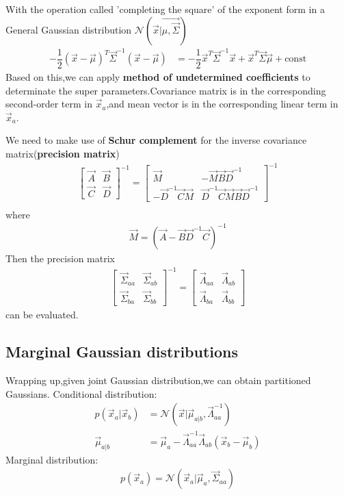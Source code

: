 With the operation called 'completing the square' of the exponent form in a General Gaussian distribution $\mathcal{N}(\vec{x}|\vec{\mu,\vec{\Sigma}})$
\begin{align}
-\dfrac{1}{2}(\vec{x}-\vec{\mu})^T\vec{\Sigma}^{-1}(\vec{x}-\vec{\mu}) &= 
-\dfrac{1}{2}\vec{x}^T\vec{\Sigma}^{-1}\vec{x}+\vec{x}^T\vec{\Sigma}\vec{\mu} + \text{const}
\end{align}
Based on this,we can apply \textbf{method of undetermined coefficients} to determinate the super parameters.Covariance matrix is in the corresponding second-order term in $\vec{x}_a$,and mean vector is in the corresponding linear term in $\vec{x}_a$. 

We need to make use of \textbf{Schur complement} for the inverse covariance matrix(\textbf{precision matrix})
\begin{align}
\left[ \begin{array}{cc} 
\vec{A} & \vec{B} \\
\vec{C} & \vec{D}  
\end{array}\right]^{-1}
= \left[ \begin{array}{cc} 
\vec{M} & -\vec{M}\vec{B}\vec{D}^{-1} \\
-\vec{D}^{-1}\vec{C}\vec{M} & \vec{D}^{-1}\vec{C}\vec{M}\vec{B}\vec{D}^{-1}
\end{array}\right]^{-1} \\
\end{align}
where
\begin{align}
\vec{M} = (\vec{A}-\vec{B}\vec{D}^{-1}\vec{C})^{-1}
\end{align}
Then the precision matrix
\begin{align}
\left[ \begin{array}{cc}
 \vec{\Sigma}_{aa} & \vec{\Sigma}_{ab} \\
 \vec{\Sigma}_{ba} & \vec{\Sigma}_{bb} 
 \end{array}\right]^{-1} =
 \left[ \begin{array}{cc} \vec{\varLambda}_{aa} & \vec{\varLambda}_{ab} \\
  \vec{\varLambda}_{ba} & \vec{\varLambda}_{bb} \end{array}\right]
\end{align}
can be evaluated.

\subsection{Marginal Gaussian distributions}
Wrapping up,given joint Gaussian distribution,we can obtain partitioned Gaussians.
Conditional distribution:
\begin{align}
p(\vec{x}_a|\vec{x}_b) &= \mathcal{N}(\vec{x}|\vec{\mu}_{a|b},\vec{\varLambda}_{aa}^{-1}) \\
\vec{\mu}_{a|b} &= \vec{\mu}_a-\vec{\varLambda}_{aa}^{-1}\vec{\varLambda}_{ab}(\vec{x}_b-\vec{\mu}_b)
\end{align}
Marginal distribution:
\begin{align}
p(\vec{x}_a) = \mathcal{N}(\vec{x}_a|\vec{\mu}_a,\vec{\Sigma}_{aa})
\end{align}
